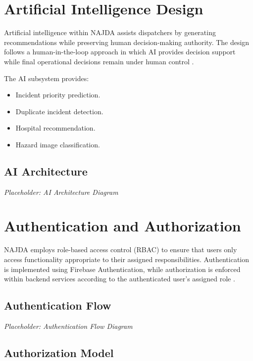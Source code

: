 \section{Artificial Intelligence Design}

Artificial intelligence within NAJDA assists dispatchers by generating recommendations while preserving human decision-making authority. The design follows a human-in-the-loop approach in which AI provides decision support while final operational decisions remain under human control \cite{xgboost,mobilenetv2}.

The AI subsystem provides:

\begin{itemize}
    \item Incident priority prediction.
    \item Duplicate incident detection.
    \item Hospital recommendation.
    \item Hazard image classification.
\end{itemize}

\subsection{AI Architecture}

\textit{Placeholder: AI Architecture Diagram}


\section{Authentication and Authorization}

NAJDA employs role-based access control (RBAC) to ensure that users only access functionality appropriate to their assigned responsibilities. Authentication is implemented using Firebase Authentication, while authorization is enforced within backend services according to the authenticated user's assigned role \cite{firebase}.

\subsection{Authentication Flow}

\textit{Placeholder: Authentication Flow Diagram}

\subsection{Authorization Model}

